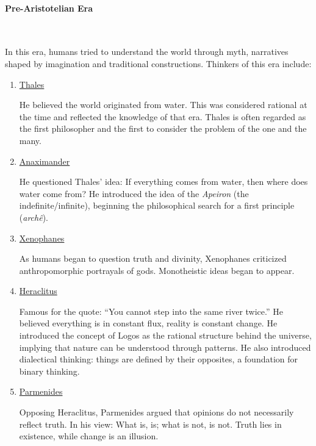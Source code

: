 \documentclass[12pt,a4paper,openany]{article}
\begin{document}
\paragraph{Pre-Aristotelian Era}\label{pre-aristotelian-era}\

In this era, humans tried to understand the world through myth,
narratives shaped by imagination and traditional constructions. Thinkers
of this era include:

\begin{enumerate}

\item \href{https://en.wikipedia.org/wiki/Thales_of_Miletus}{Thales}
  
He believed the world originated from water. This was considered rational
at the time and reflected the knowledge of that era. Thales is often
regarded as the first philosopher and the first to consider the problem
of the one and the many.

\item \href{https://en.wikipedia.org/wiki/Anaximander}{Anaximander}
  
He questioned Thales' idea: If everything comes from water, then where
does water come from? He introduced the idea of the \emph{Apeiron} (the
indefinite/infinite), beginning the philosophical search for a first
principle (\emph{archê}).

\item \href{https://en.wikipedia.org/wiki/Xenophanes}{Xenophanes} 

As humans began to question truth and divinity, Xenophanes criticized
anthropomorphic portrayals of gods. Monotheistic ideas began to appear.

\item \href{https://en.wikipedia.org/wiki/Heraclitus}{Heraclitus}
  
Famous for the quote: “You cannot step into the same river twice.” He believed everything is in constant flux, reality is constant change. He introduced the concept of Logos as the rational structure behind the universe, implying that nature can be understood through patterns.
He also introduced dialectical thinking: things are defined by their opposites, a foundation for binary thinking. 

\item \href{https://en.wikipedia.org/wiki/Parmenides}{Parmenides}

Opposing Heraclitus, Parmenides argued that opinions do not necessarily
reflect truth. In his view: What is, is; what is not, is not. Truth lies
in existence, while change is an illusion.


\end{enumerate}
\end{document}
